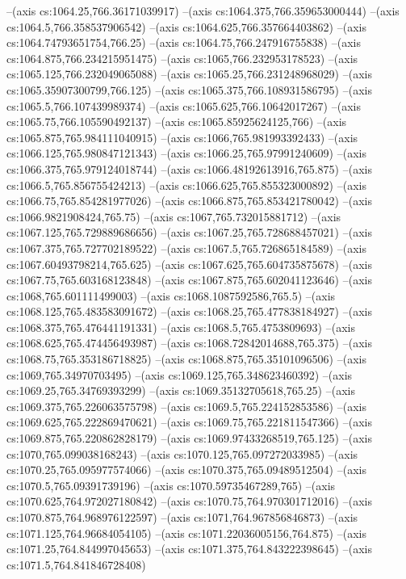 --(axis cs:1064.25,766.36171039917)
--(axis cs:1064.375,766.359653000444)
--(axis cs:1064.5,766.358537906542)
--(axis cs:1064.625,766.357664403862)
--(axis cs:1064.74793651754,766.25)
--(axis cs:1064.75,766.247916755838)
--(axis cs:1064.875,766.234215951475)
--(axis cs:1065,766.232953178523)
--(axis cs:1065.125,766.232049065088)
--(axis cs:1065.25,766.231248968029)
--(axis cs:1065.35907300799,766.125)
--(axis cs:1065.375,766.108931586795)
--(axis cs:1065.5,766.107439989374)
--(axis cs:1065.625,766.10642017267)
--(axis cs:1065.75,766.105590492137)
--(axis cs:1065.85925624125,766)
--(axis cs:1065.875,765.984111040915)
--(axis cs:1066,765.981993392433)
--(axis cs:1066.125,765.980847121343)
--(axis cs:1066.25,765.97991240609)
--(axis cs:1066.375,765.979124018744)
--(axis cs:1066.48192613916,765.875)
--(axis cs:1066.5,765.856755424213)
--(axis cs:1066.625,765.855323000892)
--(axis cs:1066.75,765.854281977026)
--(axis cs:1066.875,765.853421780042)
--(axis cs:1066.9821908424,765.75)
--(axis cs:1067,765.732015881712)
--(axis cs:1067.125,765.729889686656)
--(axis cs:1067.25,765.728688457021)
--(axis cs:1067.375,765.727702189522)
--(axis cs:1067.5,765.726865184589)
--(axis cs:1067.60493798214,765.625)
--(axis cs:1067.625,765.604735875678)
--(axis cs:1067.75,765.603168123848)
--(axis cs:1067.875,765.602041123646)
--(axis cs:1068,765.601111499003)
--(axis cs:1068.1087592586,765.5)
--(axis cs:1068.125,765.483583091672)
--(axis cs:1068.25,765.477838184927)
--(axis cs:1068.375,765.476441191331)
--(axis cs:1068.5,765.4753809693)
--(axis cs:1068.625,765.474456493987)
--(axis cs:1068.72842014688,765.375)
--(axis cs:1068.75,765.353186718825)
--(axis cs:1068.875,765.35101096506)
--(axis cs:1069,765.34970703495)
--(axis cs:1069.125,765.348623460392)
--(axis cs:1069.25,765.34769393299)
--(axis cs:1069.35132705618,765.25)
--(axis cs:1069.375,765.226063575798)
--(axis cs:1069.5,765.224152853586)
--(axis cs:1069.625,765.222869470621)
--(axis cs:1069.75,765.221811547366)
--(axis cs:1069.875,765.220862828179)
--(axis cs:1069.97433268519,765.125)
--(axis cs:1070,765.099038168243)
--(axis cs:1070.125,765.097272033985)
--(axis cs:1070.25,765.095977574066)
--(axis cs:1070.375,765.09489512504)
--(axis cs:1070.5,765.09391739196)
--(axis cs:1070.59735467289,765)
--(axis cs:1070.625,764.972027180842)
--(axis cs:1070.75,764.970301712016)
--(axis cs:1070.875,764.968976122597)
--(axis cs:1071,764.967856846873)
--(axis cs:1071.125,764.96684054105)
--(axis cs:1071.22036005156,764.875)
--(axis cs:1071.25,764.844997045653)
--(axis cs:1071.375,764.843222398645)
--(axis cs:1071.5,764.841846728408)
